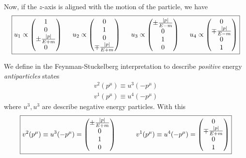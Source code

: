 \documentclass{book}
\theoremstyle{definition}
\newcommand{\f}[2]{\frac{#1}{#2}}
\begin{document}
Now, if the $z$-axis is aligned with the motion of the particle, we have
\begin{align}
\boxed{
u_1 \propto \begin{pmatrix}
1 \\ 0 \\ \pm\f{\abs{p}}{E+m} \\ 0
\end{pmatrix}
\hspace{0.5cm}
u_2 \propto \begin{pmatrix}
0 \\ 1\\ 0 \\ \mp\f{\abs{p}}{E+m}
\end{pmatrix}
\hspace{0.5cm}
u_3 \propto \begin{pmatrix}
\pm\f{\abs{p}}{E-m} \\0 \\ 1\\ 0
\end{pmatrix}
\hspace{0.5cm}
u_4 \propto\begin{pmatrix}
0 \\ \mp\f{\abs{p}}{E-m} \\ 0 \\1
\end{pmatrix}
}
\end{align}

We define in the Feynman-Stuckelberg interpretation to describe \textit{positive} energy \textit{antiparticles} states 
\begin{align}
v^2(p^\mu) \equiv u^3(-p^\mu) \\ 
v^1(p^\mu) \equiv u^4(-p^\mu) 
\end{align}
where $u^3, u^3$ are describe negative energy particles. With this
\begin{align}
\boxed{v^2(p^\mu) \equiv u^3(-p^\mu) = \begin{pmatrix}
\pm\f{\abs{p}}{E+m} \\0 \\ 1\\ 0
\end{pmatrix} 
\hspace{1cm}
v^1(p^\mu) \equiv u^4(-p^\mu) = \begin{pmatrix}
0 \\ \mp\f{\abs{p}}{E+m} \\ 0 \\1
\end{pmatrix}}
\end{align}
\end{document}
